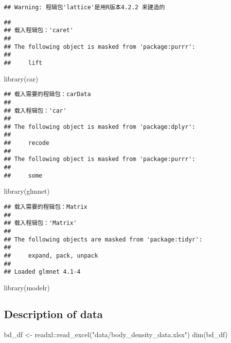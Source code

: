 \documentclass[
]{article}
\newenvironment{Shaded}{\begin{snugshade}}{\end{snugshade}}
\newcommand{\FunctionTok}[1]{\textcolor[rgb]{0.00,0.00,0.00}{#1}}
\newcommand{\NormalTok}[1]{#1}
\newcommand{\OtherTok}[1]{\textcolor[rgb]{0.56,0.35,0.01}{#1}}
\newcommand{\SpecialCharTok}[1]{\textcolor[rgb]{0.00,0.00,0.00}{#1}}
\newcommand{\StringTok}[1]{\textcolor[rgb]{0.31,0.60,0.02}{#1}}
\begin{document}
\begin{verbatim}
## Warning: 程辑包'lattice'是用R版本4.2.2 来建造的
\end{verbatim}

\begin{verbatim}
## 
## 载入程辑包：'caret'
## 
## The following object is masked from 'package:purrr':
## 
##     lift
\end{verbatim}

\begin{Shaded}
\begin{Highlighting}[]
\FunctionTok{library}\NormalTok{(car)}
\end{Highlighting}
\end{Shaded}

\begin{verbatim}
## 载入需要的程辑包：carData
## 
## 载入程辑包：'car'
## 
## The following object is masked from 'package:dplyr':
## 
##     recode
## 
## The following object is masked from 'package:purrr':
## 
##     some
\end{verbatim}

\begin{Shaded}
\begin{Highlighting}[]
\FunctionTok{library}\NormalTok{(glmnet)}
\end{Highlighting}
\end{Shaded}

\begin{verbatim}
## 载入需要的程辑包：Matrix
## 
## 载入程辑包：'Matrix'
## 
## The following objects are masked from 'package:tidyr':
## 
##     expand, pack, unpack
## 
## Loaded glmnet 4.1-4
\end{verbatim}

\begin{Shaded}
\begin{Highlighting}[]
\FunctionTok{library}\NormalTok{(modelr)}
\end{Highlighting}
\end{Shaded}

\hypertarget{description-of-data}{%
\subsection{Description of data}\label{description-of-data}}

\begin{Shaded}
\begin{Highlighting}[]
\NormalTok{bd\_df }\OtherTok{\textless{}{-}}\NormalTok{ readxl}\SpecialCharTok{::}\FunctionTok{read\_excel}\NormalTok{(}\StringTok{"data/body\_density\_data.xlsx"}\NormalTok{)}
\FunctionTok{dim}\NormalTok{(bd\_df)}
\end{Highlighting}
\end{Shaded}
\end{document}
